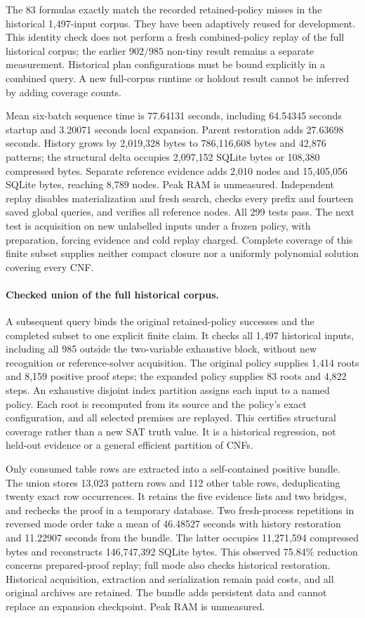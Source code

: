 \documentclass[11pt,a4paper]{article}
\numberwithin{equation}{section}
\theoremstyle{plain}
\theoremstyle{definition}
\theoremstyle{remark}
\begin{document}
The 83 formulas exactly match the recorded retained-policy misses in the
historical 1,497-input corpus. They have been adaptively reused for development.
This identity check does not perform a fresh combined-policy replay of the full
historical corpus; the earlier $902/985$ non-tiny result remains a separate
measurement. Historical plan configurations must be bound explicitly in a
combined query. A new full-corpus runtime or holdout result cannot be inferred
by adding coverage counts.

Mean six-batch sequence time is 77.64131 seconds, including
64.54345 seconds startup and 3.20071 seconds local expansion.
Parent restoration adds 27.63698 seconds. History grows by 2,019,328 bytes
to 786,116,608 bytes and 42,876 patterns; the structural delta occupies 2,097,152
SQLite bytes or 108,380 compressed bytes. Separate reference evidence adds
2,010 nodes and 15,405,056 SQLite bytes, reaching 8,789 nodes. Peak RAM is unmeasured.
Independent replay disables materialization and fresh search, checks every prefix
and fourteen saved global queries, and verifies all reference nodes. All 299 tests
pass. The next test is acquisition on new unlabelled inputs under a frozen policy,
with preparation, forcing evidence and cold replay charged. Complete coverage of
this finite subset supplies neither compact closure nor a uniformly polynomial
solution covering every CNF.

\paragraph{Checked union of the full historical corpus.}
A subsequent query binds the original retained-policy successes and the completed
subset to one explicit finite claim. It checks all 1,497 historical inputs,
including all 985 outside the two-variable exhaustive block, without new
recognition or reference-solver acquisition. The original policy supplies 1,414
roots and 8,159 positive proof steps; the expanded policy supplies 83 roots and
4,822 steps. An exhaustive disjoint index partition assigns each input to a named
policy. Each root is recomputed from its source and the policy's exact
configuration, and all selected premises are replayed. This certifies structural
coverage rather than a new SAT truth value. It is a historical regression, not
held-out evidence or a general efficient partition of CNFs.

Only consumed table rows are extracted into a self-contained positive bundle.
The union stores 13,023 pattern rows and 112 other table rows, deduplicating twenty
exact row occurrences. It retains the five evidence lists and two bridges, and
rechecks the proof in a temporary database. Two fresh-process repetitions in
reversed mode order take a mean of 46.48527 seconds with history restoration and
11.22907 seconds from the bundle. The latter occupies 11,271,594 compressed bytes
and reconstructs 146,747,392 SQLite bytes. This observed 75.84\% reduction concerns
prepared-proof replay; full mode also checks historical restoration. Historical
acquisition, extraction and serialization remain paid costs, and all original
archives are retained. The bundle adds persistent data and cannot replace an
expansion checkpoint. Peak RAM is unmeasured.
\end{document}
